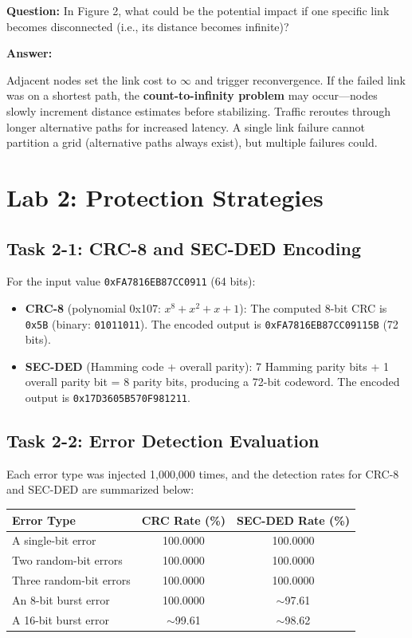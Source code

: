 \documentclass[12pt, letterpaper]{article}
\newcommand{\lab}[1]{\section*{Lab #1}}
\newcommand{\task}[1]{\subsection*{Task #1}}
\newcommand{\question}[1]{\noindent\textbf{Question: }#1\par\vspace{0.5em}}
\newcommand{\answer}{\noindent\textbf{Answer:}\par\vspace{0.5em}}
\begin{document}
\question{In Figure 2, what could be the potential impact if one specific link becomes disconnected (i.e., its distance becomes infinite)?}

\answer
Adjacent nodes set the link cost to $\infty$ and trigger reconvergence. If the failed link was on a shortest path, the \textbf{count-to-infinity problem} may occur---nodes slowly increment distance estimates before stabilizing. Traffic reroutes through longer alternative paths for increased latency. A single link failure cannot partition a grid (alternative paths always exist), but multiple failures could.

\pagebreak
\lab{2: Protection Strategies}

\task{2-1: CRC-8 and SEC-DED Encoding}

For the input value \texttt{0xFA7816EB87CC0911} (64 bits):

\begin{itemize}
    \item \textbf{CRC-8} (polynomial 0x107: $x^8 + x^2 + x + 1$): The computed 8-bit CRC is \texttt{0x5B} (binary: \texttt{01011011}). The encoded output is \texttt{0xFA7816EB87CC09115B} (72 bits).
    \item \textbf{SEC-DED} (Hamming code + overall parity): 7 Hamming parity bits + 1 overall parity bit = 8 parity bits, producing a 72-bit codeword. The encoded output is \texttt{0x17D3605B570F981211}.
\end{itemize}



\task{2-2: Error Detection Evaluation}

Each error type was injected 1,000,000 times, and the detection rates for CRC-8 and SEC-DED are summarized below:

\begin{center}
\begin{tabular}{|l|c|c|}
\hline
\textbf{Error Type} & \textbf{CRC Rate (\%)} & \textbf{SEC-DED Rate (\%)} \\ \hline
A single-bit error       & 100.0000 & 100.0000 \\ \hline
Two random-bit errors    & 100.0000 & 100.0000 \\ \hline
Three random-bit errors  & 100.0000 & 100.0000 \\ \hline
An 8-bit burst error     & 100.0000 & $\sim$97.61 \\ \hline
A 16-bit burst error     & $\sim$99.61 & $\sim$98.62 \\ \hline
\end{tabular}
\end{center}
\end{document}
